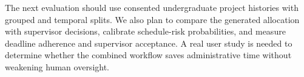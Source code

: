 \documentclass[conference]{IEEEtran}
\begin{document}
The next evaluation should use consented undergraduate project histories with grouped and temporal splits. We also plan to compare the generated allocation with supervisor decisions, calibrate schedule-risk probabilities, and measure deadline adherence and supervisor acceptance. A real user study is needed to determine whether the combined workflow saves administrative time without weakening human oversight.

\balance


\end{document}
